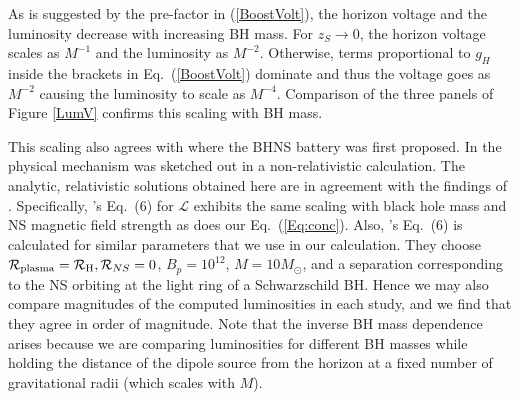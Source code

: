 As is suggested by the pre-factor in (\ref{BoostVolt}), the horizon
voltage and the luminosity decrease with increasing BH mass. 
For $z_S \rightarrow 0$, the horizon voltage scales as $M^{-1}$ and the luminosity as $M^{-2}$.
Otherwise, terms proportional to $g_H$ inside the brackets in
Eq.\  (\ref{BoostVolt}) dominate and thus the voltage goes as $M^{-2}$
causing the luminosity to scale as $M^{-4}$. Comparison of the three
panels of Figure \ref{LumV} confirms this scaling with BH mass. 

This scaling also agrees
with \citep{McL:2011} where the BHNS battery was first proposed. In \citep{McL:2011} the physical mechanism 
was sketched out in a non-relativistic calculation. The analytic, relativistic solutions obtained here are in agreement with the findings of \citep{McL:2011}. Specifically, \citep{McL:2011}'s Eq.\  (6) for $\mathcal{L}$ exhibits the same scaling with black hole mass and NS magnetic field strength as does our Eq.\  (\ref{Eq:conc}). Also, \citep{McL:2011}'s Eq.\  (6) is calculated for similar parameters that we use in our calculation. They choose $\mathcal{R}_{\rm plasma} = \mathcal{R}_{\rm H}, \mathcal{R}_{NS}=0$, $B_p=10^{12}$,  $M=10 M_{\odot}$, and a separation corresponding to the NS orbiting at the light ring of a Schwarzschild BH. Hence we may also compare magnitudes of the computed luminosities in each study, and we find that they agree in order of magnitude. Note that the inverse BH mass dependence arises because we are comparing luminosities for different BH masses while holding the distance of the dipole source from the horizon at a fixed number of gravitational radii (which scales with $M$).






